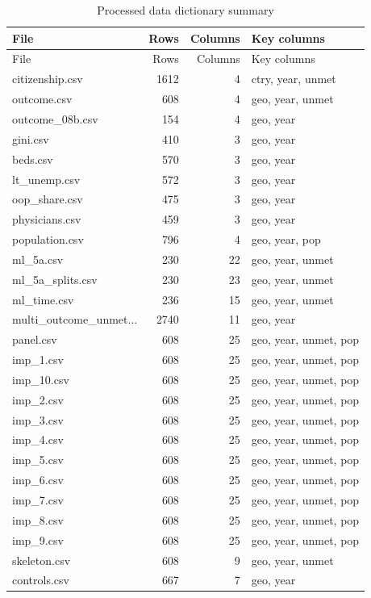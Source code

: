 \begingroup
\scriptsize
\begin{longtable}{@{}>{\raggedright\arraybackslash}p{}rr>{\raggedright\arraybackslash}p{}@{}}
\caption{Processed data dictionary summary}\label{tab:processed_data_dictionary_summary}\\
\toprule
File & Rows & Columns & Key columns \\
\midrule
\endfirsthead
\toprule
File & Rows & Columns & Key columns \\
\midrule
\endhead
citizenship.csv & 1612 & 4 & ctry, year, unmet \\
outcome.csv & 608 & 4 & geo, year, unmet \\
outcome\_08b.csv & 154 & 4 & geo, year \\
gini.csv & 410 & 3 & geo, year \\
beds.csv & 570 & 3 & geo, year \\
lt\_unemp.csv & 572 & 3 & geo, year \\
oop\_share.csv & 475 & 3 & geo, year \\
physicians.csv & 459 & 3 & geo, year \\
population.csv & 796 & 4 & geo, year, pop \\
ml\_5a.csv & 230 & 22 & geo, year, unmet \\
ml\_5a\_splits.csv & 230 & 23 & geo, year, unmet \\
ml\_time.csv & 236 & 15 & geo, year, unmet \\
multi\_outcome\_unmet... & 2740 & 11 & geo, year \\
panel.csv & 608 & 25 & geo, year, unmet, pop \\
imp\_1.csv & 608 & 25 & geo, year, unmet, pop \\
imp\_10.csv & 608 & 25 & geo, year, unmet, pop \\
imp\_2.csv & 608 & 25 & geo, year, unmet, pop \\
imp\_3.csv & 608 & 25 & geo, year, unmet, pop \\
imp\_4.csv & 608 & 25 & geo, year, unmet, pop \\
imp\_5.csv & 608 & 25 & geo, year, unmet, pop \\
imp\_6.csv & 608 & 25 & geo, year, unmet, pop \\
imp\_7.csv & 608 & 25 & geo, year, unmet, pop \\
imp\_8.csv & 608 & 25 & geo, year, unmet, pop \\
imp\_9.csv & 608 & 25 & geo, year, unmet, pop \\
skeleton.csv & 608 & 9 & geo, year, unmet \\
controls.csv & 667 & 7 & geo, year \\
\bottomrule
\end{longtable}
\endgroup
